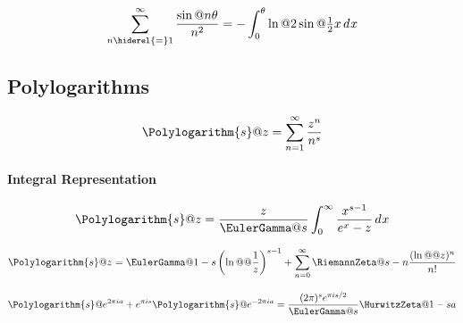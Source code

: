 \documentclass{article}
\begin{document}
\begin{equation}\label{eq:ZE.JON.DI8}%
  \sum_{n \hiderel{=} 1}^\infty \frac{\sin@{n \theta}}{n^2}
  = - \int_0^\theta \ln@{2 \sin@{\tfrac{1}{2} x}} \diff{x}
\end{equation}


\subsection{Polylogarithms}\label{sec:ZE.JON.GEN}%


\begin{equation}\label{eq:ZE.JON.GEN1}%
  \Polylogarithm{s}@{z} = \sum_{n=1}^\infty \frac{z^n}{n^s}
\end{equation}

\paragraph{Integral Representation}

 
\begin{equation}\label{eq:ZE.JON.GEN2}
  \Polylogarithm{s}@{z}
  = \frac{z}{\EulerGamma@{s}} \int_0^\infty \frac{x^{s-1}}{\expe^x - z} \diff{x}
\end{equation}

 
\begin{equation}\label{eq:ZE.JON.GEN3}%
  \Polylogarithm{s}@{z}
  = \EulerGamma@{1-s} \left( \ln@@{\frac{1}{z}} \right)^{s-1}
  + \sum_{n=0}^\infty \RiemannZeta@{s-n} \frac{(\ln@@{z})^n}{n!}
\end{equation}

 
\begin{equation}\label{eq:ZE.JON.GEN4}%
  \Polylogarithm{s}@{\expe^{2 \cpi \iunit a}}
  + \expe^{\cpi \iunit s} \Polylogarithm{s}@{\expe^{-2 \cpi \iunit a}}
  = \frac{(2 \cpi)^s \expe^{\cpi \iunit s/2}}{\EulerGamma@{s}} \HurwitzZeta@{1-s}{a}
\end{equation}
\end{document}
